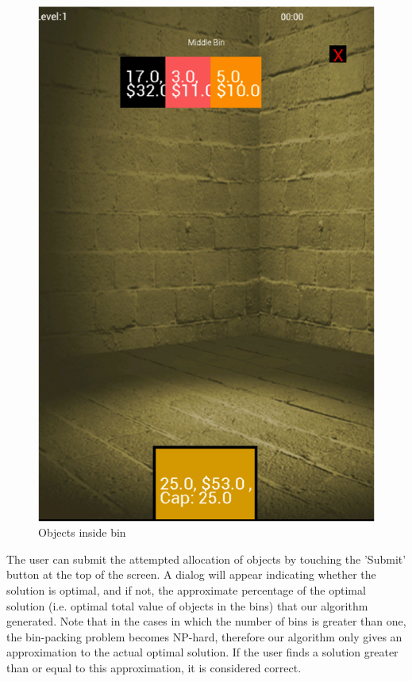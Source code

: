 \documentclass[11pt]{article}
\begin{document}
\begin{figure}[h]
\centering
\includegraphics[scale=0.65]{inside_bin.png}
\caption{Objects inside bin}
\end{figure}

The user can submit the attempted allocation of objects by touching the 'Submit'
button at the top of the screen.  A dialog will appear indicating whether the
solution is optimal, and if not, the approximate percentage of the optimal
solution (i.e. optimal total value of objects in the bins) that our algorithm
generated.  Note that in the cases in which the number of bins is greater than
one, the bin-packing problem becomes NP-hard, therefore our algorithm only gives
an approximation to the actual optimal solution.  If the user finds a solution
greater than or equal to this approximation, it is considered correct.
\end{document}
